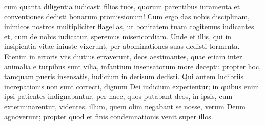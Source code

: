 \begin{biblechapter}
\begin{biblechapter}
\begin{biblechapter}
\begin{biblechapter}
\begin{biblechapter}
\begin{biblechapter}
\begin{biblechapter}
\begin{biblechapter}
\begin{biblechapter}
\begin{biblechapter}
\begin{biblechapter}
\begin{biblechapter}
 \verse cum quanta diligentia iudicasti filios tuos,
 quorum parentibus iuramenta
 et conventiones dedisti bonarum promissionum!
 \verse Cum ergo das nobis disciplinam,
 inimicos nostros multipliciter flagellas,
 ut bonitatem tuam cogitemus iudicantes
 et, cum de nobis iudicatur, speremus misericordiam.
 \verse Unde et illis, qui in insipientia vitae iniuste vixerunt,
 per abominationes suas dedisti tormenta.
 \verse Etenim in erroris viis diutius erraverunt,
 deos aestimantes, quae etiam inter animalia e turpibus sunt vilia,
 infantium insensatorum more decepti:
 \verse propter hoc, tamquam pueris insensatis,
 iudicium in derisum dedisti.
 \verse Qui autem ludibriis increpationis non sunt correcti,
 dignum Dei iudicium experientur;
 \verse in quibus enim ipsi patientes indignabantur,
 per haec, quos putabant deos,
 in ipsis, cum exterminarentur, videntes,
 illum, quem olim negabant se nosse, verum Deum agnoverunt;
 propter quod et finis condemnationis venit super illos.
 

\end{biblechapter}
\end{biblechapter}
\end{biblechapter}
\end{biblechapter}
\end{biblechapter}
\end{biblechapter}
\end{biblechapter}
\end{biblechapter}
\end{biblechapter}
\end{biblechapter}
\end{biblechapter}
\end{biblechapter}
